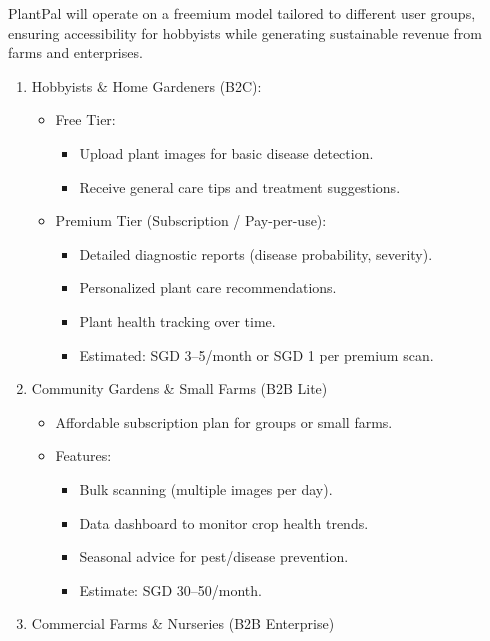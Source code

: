 \documentclass[11pt]{article}
\begin{document}
PlantPal will operate on a freemium model tailored to different user groups, ensuring accessibility for hobbyists while generating sustainable revenue from farms and enterprises.

\begin{enumerate}
    \item Hobbyists \& Home Gardeners (B2C):
    \begin{itemize}
        \item Free Tier:
        \begin{itemize}
            \item Upload plant images for basic disease detection.
            \item 
        Receive general care tips and treatment suggestions.
        \end{itemize}
        \item Premium Tier (Subscription / Pay-per-use):
        \begin{itemize}
            \item Detailed diagnostic reports (disease probability, severity).
            \item Personalized plant care recommendations.
            \item Plant health tracking over time.
            \item Estimated: SGD 3–5/month or SGD 1 per premium scan.
        \end{itemize}
    \end{itemize}
    \item Community Gardens \& Small Farms (B2B Lite)
    \begin{itemize}
        \item Affordable subscription plan for groups or small farms.
        \item Features:
        \begin{itemize}
            \item Bulk scanning (multiple images per day).
            \item Data dashboard to monitor crop health trends.
            \item Seasonal advice for pest/disease prevention.
            \item Estimate: SGD 30–50/month.
        \end{itemize}
    \end{itemize}
    \item Commercial Farms \& Nurseries (B2B Enterprise)
    \begin{itemize}

\end{itemize}
\end{enumerate}
\end{document}
